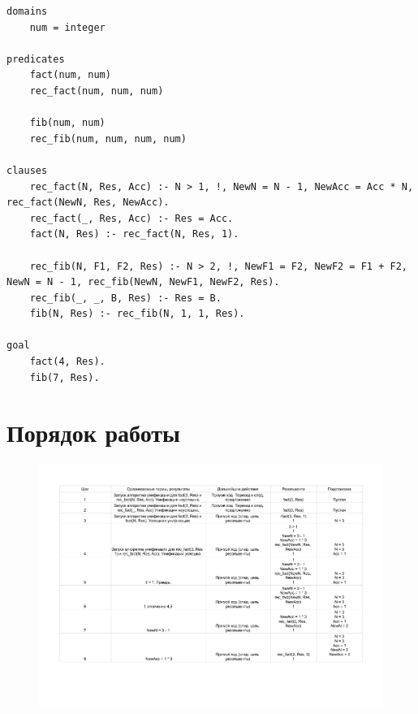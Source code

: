 \documentclass[12pt]{report}
\begin{document}
\begin{lstlisting}
domains
	num = integer

predicates
	fact(num, num)
	rec_fact(num, num, num)
	
	fib(num, num)
	rec_fib(num, num, num, num)

clauses
	rec_fact(N, Res, Acc) :- N > 1, !, NewN = N - 1, NewAcc = Acc * N, rec_fact(NewN, Res, NewAcc).
	rec_fact(_, Res, Acc) :- Res = Acc.
	fact(N, Res) :- rec_fact(N, Res, 1).
	
	rec_fib(N, F1, F2, Res) :- N > 2, !, NewF1 = F2, NewF2 = F1 + F2, NewN = N - 1, rec_fib(NewN, NewF1, NewF2, Res).
	rec_fib(_, _, B, Res) :- Res = B.
	fib(N, Res) :- rec_fib(N, 1, 1, Res).

goal
	fact(4, Res).
	fib(7, Res).
\end{lstlisting}

\section*{Порядок работы}

\begin{figure}[H]
	\begin{center}
		\includegraphics[scale=0.7]{imgs/table_16_01-1.pdf}
	\end{center}
\end{figure}
\end{document}
